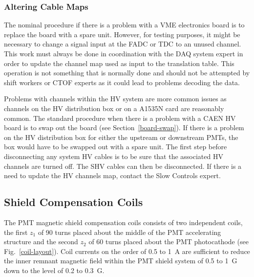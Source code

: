 \documentclass[12pt]{article}
\begin{document}
\subsubsection{Altering Cable Maps}

The nominal procedure if there is a problem with a VME electronics board is to replace the board
with a spare unit. However, for testing purposes, it might be necessary to change a signal input
at the FADC or TDC to an unused channel. This work must always be done in coordination with the 
DAQ system expert in order to update the channel map used as input to the translation table. This 
operation is not something that is normally done and should not be attempted by shift workers or 
CTOF experts as it could lead to problems decoding the data.

Problems with channels within the HV system are more common issues as channels on the HV 
distribution box or on a A1535N card are reasonably common. The standard procedure when there is 
a problem with a CAEN HV board is to swap out the board (see Section~\ref{board-swap}). If there 
is a problem on the HV distribution box for either the upstream or downstream PMTs, the box would 
have to be swapped out with a spare unit. The first step before disconnecting any system HV 
cables is to be sure that the associated HV channels are turned off. The SHV cables can then be 
disconnected. If there is a need to update the HV channels map, contact the Slow Controls expert.

\subsection{Shield Compensation Coils}
\label{comp-coils}

The PMT magnetic shield compensation coils consists of two independent coils, the first $z_1$ of 
90 turns placed about the middle of the PMT accelerating structure and the second $z_2$ of 60 
turns placed about the PMT photocathode (see Fig.~\ref{coil-layout}). Coil currents on the
order of 0.5 to 1~A are sufficient to reduce the inner remnant magnetic field within the PMT
shield system of 0.5 to 1~G down to the level of 0.2 to 0.3~G.
\end{document}
